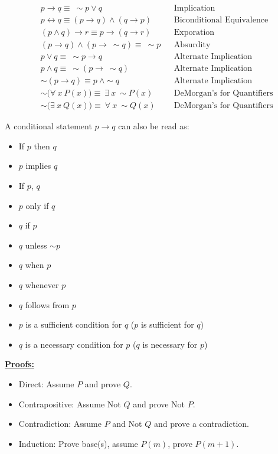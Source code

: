 \documentclass[11pt]{article}
\begin{document}
\begin{minipage}[c]{0.4\textwidth}
\begin{align*}
    &p \rightarrow q \equiv \ \sim p \vee q &&\text{Implication} \\
    &p \leftrightarrow q \equiv (p \rightarrow q) \wedge (q \rightarrow p) &&\text{Biconditional Equivalence} \\
    &(p \wedge q) \rightarrow r \equiv p \rightarrow (q \rightarrow r) &&\text{Exporation} \\
    &(p \rightarrow q) \wedge (p \rightarrow \ \sim q) \equiv \ \sim p &&\text{Absurdity} \\
    &p \vee q \equiv \ \sim p \rightarrow q &&\text{Alternate Implication} \\
    &p \wedge q \equiv \ \sim(p \rightarrow \ \sim q) &&\text{Alternate Implication} \\
    &\sim(p \rightarrow q) \equiv p \ \wedge \sim q &&\text{Alternate Implication} \\
    &\sim \Big( \forall \ x \ P(x) \Big) \equiv \ \exists \ x \ \sim P(x) &&\text{DeMorgan's for Quantifiers} \\
    &\sim \Big( \exists \ x \ Q(x) \Big) \equiv \ \forall \ x \ \sim Q(x) &&\text{DeMorgan's for Quantifiers} 
\end{align*}
\end{minipage}
{\color{lightgray}\vline}
\begin{minipage}[t][3.1in][b]{0.4 \textwidth}
A conditional statement $p \rightarrow q$ can also be read as:
\begin{itemize}
    \item If $p$ then $q$ 
    \item $p$ implies $q$
    \item If $p$, $q$
    \item $p$ only if $q$
    \item $q$ if $p$
    \item $q$ unless $\sim p$
    \item $q$ when $p$
    \item $q$ whenever $p$
    \item $q$ follows from $p$
    \item $p$ is a sufficient condition for $q$ ($p$ is sufficient for $q$)
    \item $q$ is a necessary condition for $p$ ($q$ is necessary for $p$)
\end{itemize}

\bigskip

\underline{\bf Proofs:}
\begin{itemize}
    \item Direct: Assume $P$ and prove $Q$.
    \item Contrapositive: Assume Not $Q$ and prove Not $P$.
    \item Contradiction: Assume $P$ and Not $Q$ and prove a contradiction.
    \item Induction: Prove base(s), assume $P(m)$, prove $P(m+1)$.
\end{itemize}
\end{minipage}
\end{document}
